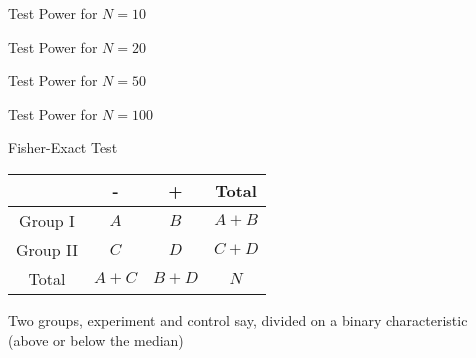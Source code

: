 \documentclass{beamer}
\begin{document}
\begin{frame}
\begin{center}\end{center}

\begin{card}Test Power for $N=10$\end{card}
\end{frame}
\begin{frame}
\begin{center}\end{center}

\begin{card}Test Power for $N=20$\end{card}
\end{frame}
\begin{frame}
\begin{center}\end{center}

\begin{card}Test Power for $N=50$\end{card}
\end{frame}
\begin{frame}
\begin{center}\end{center}

\begin{card}Test Power for $N=100$\end{card}
\end{frame}


\begin{frame}{Fisher-Exact Test}
\begin{card}
\begin{center}
\begin{tabular}{cccc}
&  -  & + & Total\\ 	\hline
	Group I & $A$  & $B$ & $A+B$ \\
	Group II & $C$ & $D$ & $C+D$ \\\cline{2-4}
	Total & $A+C$ & $B+D$ & $N$
\end{tabular}
\end{center}
\end{card}

\begin{card}
Two groups, experiment and control say, divided on a binary characteristic (above or below the median)
\end{card}
\end{frame}
\end{document}
